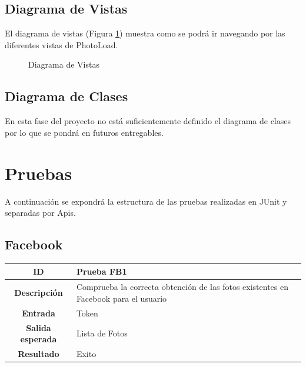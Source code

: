 \documentclass{scrartcl}
\begin{document}
\subsection{Diagrama de Vistas}\label{cap:DiagramaVistas}
El diagrama de vistas (Figura \ref{fig:DiagramaVistas}) muestra como se podrá ir navegando por las diferentes vistas de PhotoLoad.
\begin{figure}[H]
	
	\centering
	\caption{Diagrama de Vistas}
	\label{fig:DiagramaVistas}
	
\end{figure}
\subsection{Diagrama de Clases}
En esta fase del proyecto no está suficientemente definido el diagrama de clases por lo que se pondrá en futuros entregables.
\section{Pruebas}\label{cap:pruebas}
A continuación se expondrá la estructura de las pruebas realizadas en JUnit y separadas por Apis.
\subsection{Facebook}

\begin{tabularx}{14cm}{|c|X|}
	\hline \textbf{ID} & Prueba FB1\\ 
	\hline \textbf{Descripción} & Comprueba la correcta obtención de las fotos existentes en Facebook para el usuario \\	 
	\hline  \textbf{Entrada}		& Token \\ 
	\hline  \textbf{Salida esperada}			& Lista de Fotos\\
	\hline  \textbf{Resultado}			& Exito \\
	\hline 
	\end{tabularx} 
\\
\\
\end{document}
